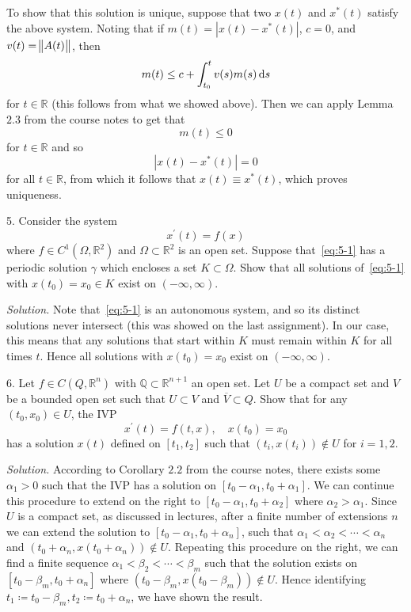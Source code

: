 \documentclass{article}
\newcommand{\Q}{\mathbb{Q}}
\newcommand{\R}{\mathbb{R}}
\begin{document}
To show that this solution is unique, suppose that two $x(t)$ and $x^*(t)$ satisfy the above system.
Noting that if $m(t) = |x(t) - x^*(t)|$, $c = 0$, and $v(t) = \enVert{A(t)}$,
then
%
\begin{equation*}
    m(t) \leq c + \int_{t_0}^t v(s) m(s) \dif s
\end{equation*}
%
for $t \in \R$ (this follows from what we showed above). Then we can apply Lemma $2.3$ from the
course notes to get that
%
\begin{equation*}
    m(t) \leq 0
\end{equation*}
%
for $t \in \R$ and so
%
\begin{equation*}
    |x(t) - x^*(t)| = 0
\end{equation*}
%
for all $t \in \R$, from which it follows that $x(t) \equiv x^*(t)$, which
proves uniqueness.

\newpage

5. Consider the system
%
\begin{equation}
    x^\prime(t) = f(x)
    \label{eq:5-1}
\end{equation}
%
where $f \in C^1(\Omega, \R^2)$ and $\Omega \subset \R^2$ is an open set. Suppose that~\eqref{eq:5-1}
has a periodic solution $\gamma$ which encloses a set $K \subset \Omega$. Show that all solutions
of~\eqref{eq:5-1} with $x(t_0) = x_0 \in K$ exist on $(- \infty, \infty)$.

\textit{Solution.}
Note that~\eqref{eq:5-1} is an autonomous system, and so its distinct
solutions never intersect (this was showed on the last assignment).
In our case, this means that any solutions that start within $K$ must
remain within $K$ for all times $t$. Hence all solutions with $x(t_0) = x_0$
exist on $(-\infty, \infty)$.

\newpage

6. Let $f \in C(Q, \R^n)$ with $\Q \subset \R^{n + 1}$ an open set. Let $U$ be a compact set and
$V$ be a bounded open set such that $U \subset V$ and $\overline{V} \subset Q$. Show that for any
$(t_0, x_0) \in U$, the IVP
%
\begin{equation*}
    x^\prime(t) = f(t, x), \quad x(t_0) = x_0
\end{equation*}
%
has a solution $x(t)$ defined on $[t_1, t_2]$ such that $(t_i, x(t_i)) \not\in U$ for $i = 1, 2$.

\textit{Solution.}
According to Corollary $2.2$ from the course notes, there exists some $\alpha_1 > 0$ such that
the IVP has a solution on $[t_0 - \alpha_1, t_0 + \alpha_1]$. We can continue this procedure to extend on the right to
$[t_0 - \alpha_1, t_0 + \alpha_2]$ where $\alpha_2 > \alpha_1$. Since $U$ is a compact set, as discussed in lectures,
after a finite number of extensions $n$ we can extend the solution to
$[t_0 - \alpha_1, t_0 + \alpha_n]$, such that $\alpha_1 < \alpha_2 < \cdots < \alpha_n$ and
$(t_0 + \alpha_n, x(t_0 + \alpha_n)) \not\in U$. Repeating this procedure on the right, we can find a finite sequence
$\alpha_1 < \beta_2 < \cdots < \beta_m$ such that the solution exists on $[t_0 - \beta_m, t_0 + \alpha_n]$ where
$(t_0 - \beta_m, x(t_0 - \beta_m)) \not\in U$. Hence identifying
$t_1 \coloneqq t_0 - \beta_m, t_2 \coloneqq t_0 + \alpha_n$, we have shown the result.
\end{document}
